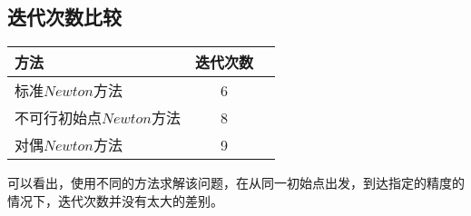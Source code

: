 \documentclass{article}
\begin{document}
\subsection{迭代次数比较}
\begin{table}[H]
    \begin{center}
    \begin{tabular}{l|c|r} %
    方法 & 迭代次数 \\
    \hline
    标准$Newton$方法 & 6 \\
    不可行初始点$Newton$方法 & 8 \\
    对偶$Newton$方法 & 9 \\
    \end{tabular}
    \end{center}
\end{table}

可以看出，使用不同的方法求解该问题，在从同一初始点出发，到达指定的精度的情况下，迭代次数并没有太大的差别。
\end{document}
